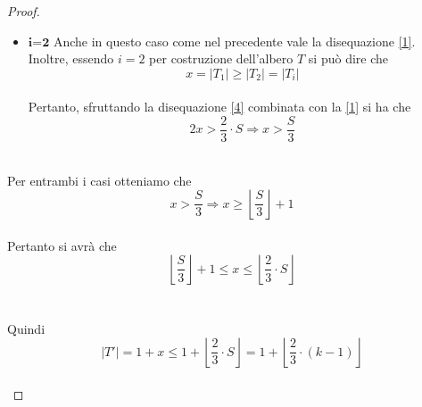 \begin{proof}
\begin{itemize}
	\begin{equation}\label{1}
		x+|T_i| > \frac{2}{3}\cdot S
	\end{equation}
\\
	Inoltre sapendo che per costruzione
	\\	
	\begin{equation}\label{2}
	|T_i| \le \frac{S}{i} \le \frac{S}{3}	
	\end{equation}
\\		
	Sottraendo la disequazione \eqref{2} alla \eqref{1} si ottiene che 
	\\
	\begin{equation}\label{3}
	x > \frac{2}{3}\cdot S - \frac{S}{3} = \frac{S}{3}	
	\end{equation}
\\
 	\item $ \textbf{i=2} $ Anche in questo caso come nel precedente vale la disequazione \eqref{1}.\\
 	Inoltre, essendo $ i = 2 $ per costruzione dell'albero $ T $ si pu\`o dire che
 	\\
 	\begin{equation}\label{4}
 	x = |T_1| \ge |T_2| = |T_i|
 	\end{equation}
 	\\
 	Pertanto, sfruttando la disequazione \eqref{4} combinata con la \eqref{1} si ha che
 	\\
 	\begin{equation}\label{5}
 	2x > \frac{2}{3} \cdot S \Rightarrow x > \frac{S}{3}
 	\end{equation}
 \\
	\end{itemize}
Per entrambi i casi otteniamo che 
\\
\[ x > \frac{S}{3} \Rightarrow x \ge \left\lfloor \frac{S}{3}\right\rfloor  + 1 \]
\\
Pertanto si avr\`a che 
\\
\[ \left\lfloor \frac{S}{3}\right\rfloor  + 1 \le x \le \left\lfloor \frac{2}{3}\cdot S \right\rfloor \] 
\\\\
Quindi 
\\
\begin{equation}\label{5}
|T'| = 1+x \le 1 + \left\lfloor \frac{2}{3}\cdot S \right\rfloor = 1 + \left\lfloor \frac{2}{3} \cdot (k-1) \right\rfloor	
\end{equation}
\\
\begin{equation}\label{6}

\end{equation}
\end{proof}
